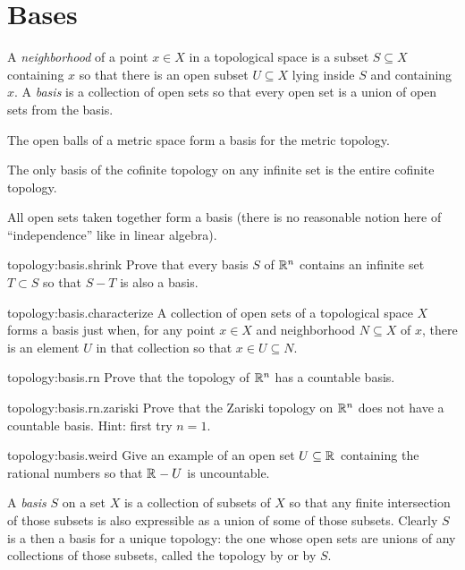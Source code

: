 \section{Bases}
A \emph{neighborhood} of a point \(x \in X\) in a topological space is a subset \(S \subseteq X\) containing \(x\) so that there is an open subset \(U \subseteq X\) lying inside \(S\) and containing \(x\).
A \emph{basis} is a collection of open sets so that every open set is a union of open sets from the basis.
\begin{example}
The open balls of a metric space form a basis for the metric topology.
\end{example}
\begin{example}
The only basis of the cofinite topology on any infinite set is the entire cofinite topology.
\end{example}
\begin{example}
All open sets taken together form a basis (there is no reasonable notion here of ``independence'' like in linear 
algebra).
\end{example}
\begin{problem}{topology:basis.shrink}
Prove that every basis \(S\) of \(\mathbb{R}^{n}\) contains an infinite set \(T \subset S\) so that \(S - T\) is also a basis.
\end{problem}
\begin{problem}{topology:basis.characterize}
A collection of open sets of a topological space \(X\) forms a basis just when, for any point \(x \in X\) and neighborhood \(N \subseteq X\) of \(x\), there is an element \(U\) in that collection so that \(x \in U \subseteq N\).
\end{problem}
\begin{problem}{topology:basis.rn}
Prove that the topology of \(\mathbb{R}^{n}\) has a countable basis.
\end{problem}
\begin{problem}{topology:basis.rn.zariski}
Prove that the Zariski topology on \(\mathbb{R}^{n}\) does not have a countable basis.
Hint: first try \(n=1\).
\end{problem}
\begin{problem*}{topology:basis.weird}
Give an example of an open set \(U \subseteq \mathbb{R}^{}\) containing the rational numbers so that \(\mathbb{R}^{}- U\) is uncountable.
\end{problem*}
A \emph{basis} \(S\) on a set \(X\) is a collection of subsets of \(X\) so that any finite intersection of those subsets is also expressible as a union of some of those subsets.
Clearly \(S\) is a then a basis for a unique topology: the one whose open sets are unions of any collections of those subsets, called the topology  by or  by \(S\).

